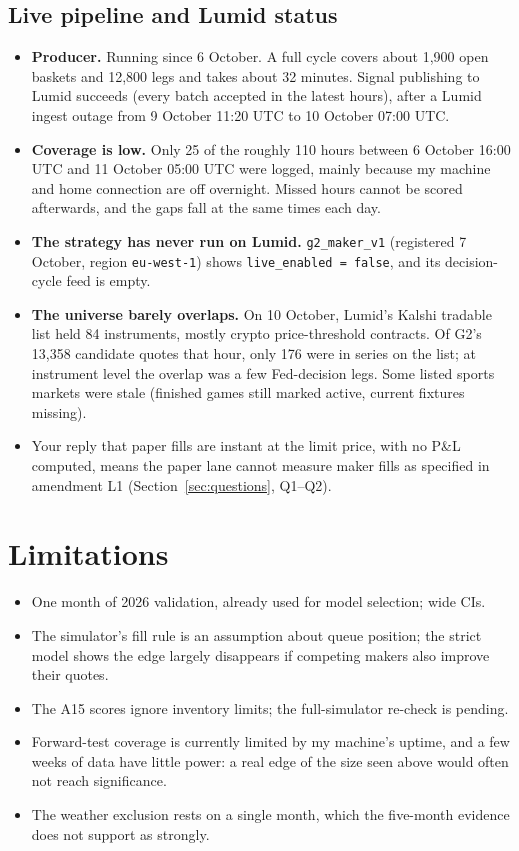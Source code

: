 \documentclass[11pt,a4paper]{article}
\begin{document}
\subsection{Live pipeline and Lumid status}
\begin{itemize}
  \item \textbf{Producer.} Running since 6 October. A full cycle covers about 1,900 open baskets and 12,800 legs
        and takes about 32 minutes. Signal publishing to Lumid succeeds (every batch accepted in the latest hours),
        after a Lumid ingest outage from 9 October 11:20 UTC to 10 October 07:00 UTC.
  \item \textbf{Coverage is low.} Only 25 of the roughly 110 hours between 6 October 16:00 UTC and 11 October 05:00
        UTC were logged, mainly because my machine and home connection are off overnight. Missed hours cannot be
        scored afterwards, and the gaps fall at the same times each day.
  \item \textbf{The strategy has never run on Lumid.} \texttt{g2\_maker\_v1} (registered 7 October, region
        \texttt{eu-west-1}) shows \texttt{live\_enabled = false}, and its decision-cycle feed is empty.
  \item \textbf{The universe barely overlaps.} On 10 October, Lumid's Kalshi tradable list held 84 instruments,
        mostly crypto price-threshold contracts. Of G2's 13,358 candidate quotes that hour, only 176 were in series
        on the list; at instrument level the overlap was a few Fed-decision legs. Some listed sports markets were
        stale (finished games still marked active, current fixtures missing).
  \item Your reply that paper fills are instant at the limit price, with no P\&L computed, means the paper lane
        cannot measure maker fills as specified in amendment L1 (Section~\ref{sec:questions}, Q1--Q2).
\end{itemize}

\section{Limitations}
\begin{itemize}
  \item One month of 2026 validation, already used for model selection; wide CIs.
  \item The simulator's fill rule is an assumption about queue position; the strict model shows the edge
        largely disappears if competing makers also improve their quotes.
  \item The A15 scores ignore inventory limits; the full-simulator re-check is pending.
  \item Forward-test coverage is currently limited by my machine's uptime, and a few weeks of data have little
        power: a real edge of the size seen above would often not reach significance.
  \item The weather exclusion rests on a single month, which the five-month evidence does not support as strongly.
\end{itemize}
\end{document}
